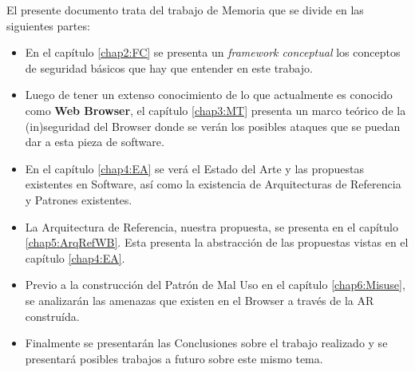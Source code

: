 El presente documento trata del trabajo de Memoria que se divide en las siguientes partes:

\begin{itemize}
	\item En el capítulo \ref{chap2:FC} se presenta un \textit{framework conceptual} los conceptos de seguridad básicos que hay que entender en este trabajo.
	\item Luego de tener un extenso conocimiento de lo que actualmente es conocido como \textbf{Web Browser}, el capítulo \ref{chap3:MT} presenta un marco teórico de la (in)seguridad del Browser donde se verán los posibles ataques que se puedan dar a esta pieza de software.
	\item En el capítulo \ref{chap4:EA} se verá el Estado del Arte y las propuestas existentes en Software, así como la existencia de Arquitecturas de Referencia y Patrones existentes.
	\item La Arquitectura de Referencia, nuestra propuesta, se presenta en el capítulo \ref{chap5:ArqRefWB}. Esta presenta la abstracción de las propuestas vistas en el capítulo \ref{chap4:EA}.
	\item Previo a la construcción del Patrón de Mal Uso en el capítulo \ref{chap6:Misuse}, se analizarán las amenazas que existen en el Browser a través de la AR construída. 
	\item Finalmente se presentarán las Conclusiones sobre el trabajo realizado y se presentará posibles trabajos a futuro sobre este mismo tema.
\end{itemize}












